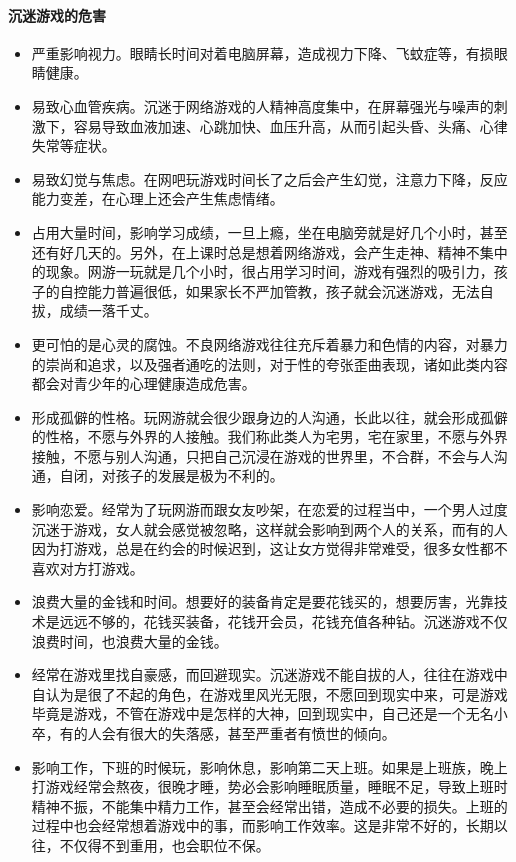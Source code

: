\paragraph{沉迷游戏的危害}

\begin{multicols}{2}
    \begin{itemize}
        \item 严重影响视力。眼睛长时间对着电脑屏幕，造成视力下降、飞蚊症等，有损眼睛健康。
        \item 易致心血管疾病。沉迷于网络游戏的人精神高度集中，在屏幕强光与噪声的刺激下，容易导致血液加速、心跳加快、血压升高，从而引起头昏、头痛、心律失常等症状。
        \item 易致幻觉与焦虑。在网吧玩游戏时间长了之后会产生幻觉，注意力下降，反应能力变差，在心理上还会产生焦虑情绪。
        \item 占用大量时间，影响学习成绩，一旦上瘾，坐在电脑旁就是好几个小时，甚至还有好几天的。另外，在上课时总是想着网络游戏，会产生走神、精神不集中的现象。网游一玩就是几个小时，很占用学习时间，游戏有强烈的吸引力，孩子的自控能力普遍很低，如果家长不严加管教，孩子就会沉迷游戏，无法自拔，成绩一落千丈。
        \item 更可怕的是心灵的腐蚀。不良网络游戏往往充斥着暴力和色情的内容，对暴力的崇尚和追求，以及强者通吃的法则，对于性的夸张歪曲表现，诸如此类内容都会对青少年的心理健康造成危害。
        \item 形成孤僻的性格。玩网游就会很少跟身边的人沟通，长此以往，就会形成孤僻的性格，不愿与外界的人接触。我们称此类人为宅男，宅在家里，不愿与外界接触，不愿与别人沟通，只把自己沉浸在游戏的世界里，不合群，不会与人沟通，自闭，对孩子的发展是极为不利的。
        \item 影响恋爱。经常为了玩网游而跟女友吵架，在恋爱的过程当中，一个男人过度沉迷于游戏，女人就会感觉被忽略，这样就会影响到两个人的关系，而有的人因为打游戏，总是在约会的时候迟到，这让女方觉得非常难受，很多女性都不喜欢对方打游戏。
        \item 浪费大量的金钱和时间。想要好的装备肯定是要花钱买的，想要厉害，光靠技术是远远不够的，花钱买装备，花钱开会员，花钱充值各种钻。沉迷游戏不仅浪费时间，也浪费大量的金钱。
        \item 经常在游戏里找自豪感，而回避现实。沉迷游戏不能自拔的人，往往在游戏中自认为是很了不起的角色，在游戏里风光无限，不愿回到现实中来，可是游戏毕竟是游戏，不管在游戏中是怎样的大神，回到现实中，自己还是一个无名小卒，有的人会有很大的失落感，甚至严重者有愤世的倾向。
        \item 影响工作，下班的时候玩，影响休息，影响第二天上班。如果是上班族，晚上打游戏经常会熬夜，很晚才睡，势必会影响睡眠质量，睡眠不足，导致上班时精神不振，不能集中精力工作，甚至会经常出错，造成不必要的损失。上班的过程中也会经常想着游戏中的事，而影响工作效率。这是非常不好的，长期以往，不仅得不到重用，也会职位不保。

\end{itemize}
\end{multicols}
